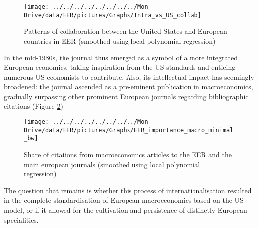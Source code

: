 \documentclass[
  12pt,
  onecolumn]{article}
\begin{document}
\begin{figure}[h]

{\centering \texttt{[image: ../../../../../../../../Mon Drive/data/EER/pictures/Graphs/Intra\_vs\_US\_collab]} 

}

\caption{Patterns of collaboration between the United States and European countries in EER (smoothed using local polynomial regression)\protect\footnotemark}\label{fig:plot-collabs}
\end{figure}


In the mid-1980s, the journal thus emerged as a symbol of a more
integrated European economics, taking inspiration from the US standards
and enticing numerous US economists to contribute. Also, its
intellectual impact has seemingly broadened: the journal ascended as a
pre-eminent publication in macroeconomics, gradually surpassing other
prominent European journals regarding bibliographic citations (Figure
\ref{fig:plot-eer-importance-macro}).

\begin{figure}[h]

{\centering \texttt{[image: ../../../../../../../../Mon Drive/data/EER/pictures/Graphs/EER\_importance\_macro\_minimal\_bw]} 

}

\caption{Share of citations from macroeconomics articles to the EER and the main european journals (smoothed using local polynomial regression)\protect\footnotemark}\label{fig:plot-eer-importance-macro}
\end{figure}


The question that remains is whether this process of
internationalisation resulted in the complete standardisation of
European macroeconomics based on the US model, or if it allowed for the
cultivation and persistence of distinctly European specialities.
\end{document}
